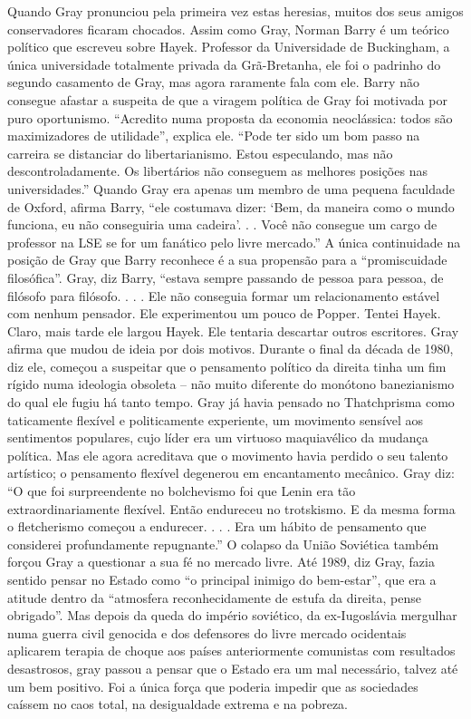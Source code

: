  
\par
 
Quando Gray pronunciou pela primeira vez estas heresias, muitos dos seus amigos conservadores ficaram chocados. Assim como Gray, Norman Barry é um teórico político que escreveu sobre Hayek. Professor da Universidade de Buckingham, a única universidade totalmente privada da Grã-Bretanha, ele foi o padrinho do segundo casamento de Gray, mas agora raramente fala com ele. Barry não consegue afastar a suspeita de que a viragem política de Gray foi motivada por puro oportunismo. “Acredito numa proposta da economia neoclássica: todos são maximizadores de utilidade”, explica ele. “Pode ter sido um bom passo na carreira se distanciar do libertarianismo. Estou especulando, mas não descontroladamente. Os libertários não conseguem as melhores posições nas universidades.” Quando Gray era apenas um membro de uma pequena faculdade de Oxford, afirma Barry, “ele costumava dizer: ‘Bem, da maneira como o mundo funciona, eu não conseguiria uma cadeira’. . . Você não consegue um cargo de professor na LSE se for um fanático pelo livre mercado.” A única continuidade na posição de Gray que Barry reconhece é a sua propensão para a “promiscuidade filosófica”. Gray, diz Barry, “estava sempre passando de pessoa para pessoa, de filósofo para filósofo. . . . Ele não conseguia formar um relacionamento estável com nenhum pensador. Ele experimentou um pouco de Popper. Tentei Hayek. Claro, mais tarde ele largou Hayek. Ele tentaria descartar outros escritores. Gray afirma que mudou de ideia por dois motivos. Durante o final da década de 1980, diz ele, começou a suspeitar que o pensamento político da direita tinha um fim rígido numa ideologia obsoleta – não muito diferente do monótono banezianismo do qual ele fugiu há tanto tempo. Gray já havia pensado no Thatchprisma como taticamente flexível e politicamente experiente, um movimento sensível aos sentimentos populares, cujo líder era um virtuoso maquiavélico da mudança política. Mas ele agora acreditava que o movimento havia perdido o seu talento artístico; o pensamento flexível degenerou em encantamento mecânico. Gray diz: “O que foi surpreendente no bolchevismo foi que Lenin era tão extraordinariamente flexível. Então endureceu no trotskismo. E da mesma forma o fletcherismo começou a endurecer. . . . Era um hábito de pensamento que considerei profundamente repugnante.” O colapso da União Soviética também forçou Gray a questionar a sua fé no mercado livre. Até 1989, diz Gray, fazia sentido pensar no Estado como “o principal inimigo do bem-estar”, que era a atitude dentro da “atmosfera reconhecidamente de estufa da direita, pense obrigado”. Mas depois da queda do império soviético, da ex-Iugoslávia mergulhar numa guerra civil genocida e dos defensores do livre mercado ocidentais aplicarem terapia de choque aos países anteriormente comunistas com resultados desastrosos, gray passou a pensar que o Estado era um mal necessário, talvez até um bem positivo. Foi a única força que poderia impedir que as sociedades caíssem no caos total, na desigualdade extrema e na pobreza.
 
